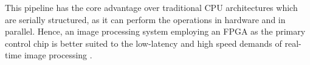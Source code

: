 This pipeline has the core advantage over traditional CPU architectures which are serially structured, as it can perform the operations in hardware and in parallel. 
Hence, an image processing system employing an FPGA as the primary control chip is better suited to the low-latency and high speed demands of real-time image processing \cite{RTEdge}.